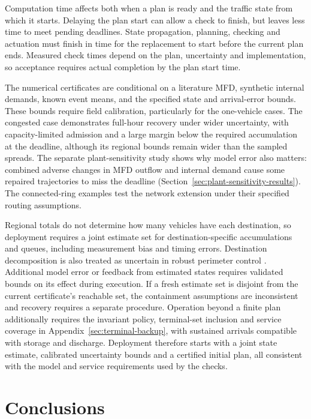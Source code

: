 \documentclass[final]{cas-sc}
\theoremstyle{definition}
\theoremstyle{plain}
\theoremstyle{definition}
\theoremstyle{plain}
\newcommand{\appref}[1]{Appendix~\ref{#1}}
\begin{document}
Computation time affects both when a plan is ready and the traffic state
from which it starts. Delaying the plan start can allow a check to finish,
but leaves less time to meet pending deadlines. State propagation,
planning, checking and actuation must finish in time for the replacement
to start before the current plan ends. Measured check times depend on
the plan, uncertainty and implementation, so acceptance requires actual
completion by the plan start time.

The numerical certificates are conditional on a literature MFD, synthetic
internal demands, known event means, and the specified state and
arrival-error bounds. These bounds
require field calibration, particularly for the one-vehicle cases. The
congested case demonstrates full-hour recovery under wider uncertainty,
with capacity-limited admission and a large margin below the required
accumulation at the deadline,
although its regional bounds remain wider than the sampled spreads.
The separate plant-sensitivity study shows why model error also matters:
combined adverse changes in MFD outflow and internal demand cause some
repaired trajectories to miss the deadline
(Section~\ref{sec:plant-sensitivity-results}). The connected-ring examples test the
network extension under their specified routing assumptions.

Regional totals do not determine how many vehicles have each destination,
so deployment requires a joint estimate set for destination-specific
accumulations and queues, including measurement bias and timing errors.
Destination decomposition is also treated as uncertain in robust perimeter
control \cite{haddad2015robust}. Additional model error or feedback from
estimated states requires validated bounds on its effect during execution.
If a fresh estimate set is disjoint from the current certificate's reachable
set, the containment assumptions are inconsistent and recovery requires a
separate procedure. Operation beyond a finite plan additionally requires
the invariant policy, terminal-set inclusion and service coverage in
\appref{sec:terminal-backup}, with sustained arrivals compatible with
storage and discharge. Deployment therefore starts with a joint state
estimate, calibrated uncertainty bounds and a certified initial plan,
all consistent with the model and service requirements used by the checks.

\section{Conclusions}
\label{sec:new-conclusion}
\end{document}

